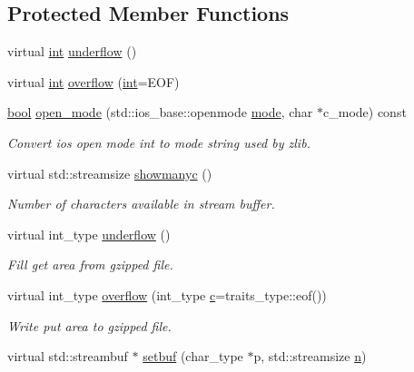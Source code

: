 \subsection*{Protected Member Functions}
\begin{DoxyCompactItemize}
\item 
virtual \mbox{\hyperlink{ioapi_8h_a787fa3cf048117ba7123753c1e74fcd6}{int}} \mbox{\hyperlink{classgzfilebuf_a40522eababebedcaab829cf0b25d4c04}{underflow}} ()
\item 
virtual \mbox{\hyperlink{ioapi_8h_a787fa3cf048117ba7123753c1e74fcd6}{int}} \mbox{\hyperlink{classgzfilebuf_a7a10ee573ebe6777c8a64e316569f694}{overflow}} (\mbox{\hyperlink{ioapi_8h_a787fa3cf048117ba7123753c1e74fcd6}{int}}=E\+OF)
\item 
\mbox{\hyperlink{libretro_8h_a4a26dcae73fb7e1528214a068aca317e}{bool}} \mbox{\hyperlink{classgzfilebuf_ab0c2c304183e591706681af26add3da2}{open\+\_\+mode}} (std\+::ios\+\_\+base\+::openmode \mbox{\hyperlink{ioapi_8h_a7e43d41c2fe013a373b540cba02505cf}{mode}}, char $\ast$c\+\_\+mode) const
\begin{DoxyCompactList}\small\item\em Convert ios open mode int to mode string used by zlib. \end{DoxyCompactList}\item 
virtual std\+::streamsize \mbox{\hyperlink{classgzfilebuf_aa6c80a4f96fdc5e4a991113699428164}{showmanyc}} ()
\begin{DoxyCompactList}\small\item\em Number of characters available in stream buffer. \end{DoxyCompactList}\item 
virtual int\+\_\+type \mbox{\hyperlink{classgzfilebuf_a23768f9935022e54608c53173f0047c0}{underflow}} ()
\begin{DoxyCompactList}\small\item\em Fill get area from gzipped file. \end{DoxyCompactList}\item 
virtual int\+\_\+type \mbox{\hyperlink{classgzfilebuf_a118cfb494fca6d5ce4d08447ea1fff2b}{overflow}} (int\+\_\+type \mbox{\hyperlink{isa-lr35902_8c_ab27f9f98dd173bfc694f5d161e839d6e}{c}}=traits\+\_\+type\+::eof())
\begin{DoxyCompactList}\small\item\em Write put area to gzipped file. \end{DoxyCompactList}\item 
virtual std\+::streambuf $\ast$ \mbox{\hyperlink{classgzfilebuf_a11ff58ab8f4de52cf496892b3a97827e}{setbuf}} (char\+\_\+type $\ast$p, std\+::streamsize \mbox{\hyperlink{isa-lr35902_8c_ae54e54065504090672c92ef62a1c5f05}{n}})

\end{DoxyCompactItemize}
